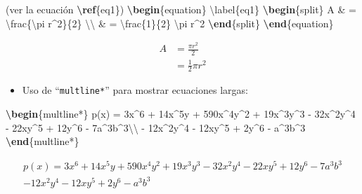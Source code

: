 \documentclass[12pt,a4paper,oneside,]{article}
\newenvironment{Shaded}{\begin{snugshade}}{\end{snugshade}}
\newcommand{\ExtensionTok}[1]{#1}
\newcommand{\KeywordTok}[1]{\textcolor[rgb]{0.13,0.29,0.53}{\textbf{#1}}}
\newcommand{\NormalTok}[1]{#1}
\newcommand{\SpecialCharTok}[1]{\textcolor[rgb]{0.00,0.00,0.00}{#1}}
\newcommand{\SpecialStringTok}[1]{\textcolor[rgb]{0.31,0.60,0.02}{#1}}
\providecommand{\tightlist}{%
  \setlength{\itemsep}{0pt}\setlength{\parskip}{0pt}}
\numberwithin{dummy}{section}
\theoremstyle{ocrenumbox}
\theoremstyle{blacknumex}
\theoremstyle{blacknumbox}
\theoremstyle{ocrenum}
\theoremstyle{ocrenum}
\begin{document}
\begin{Shaded}
\begin{Highlighting}[]
\NormalTok{(ver la ecuación }\KeywordTok{\textbackslash{}ref}\NormalTok{\{}\ExtensionTok{eq1}\NormalTok{\})}
\KeywordTok{\textbackslash{}begin}\NormalTok{\{}\ExtensionTok{equation}\NormalTok{\}}\SpecialStringTok{ }\SpecialCharTok{\textbackslash{}label}\SpecialStringTok{\{eq1\}}
\KeywordTok{\textbackslash{}begin}\NormalTok{\{}\ExtensionTok{split}\NormalTok{\}}
\SpecialStringTok{A \& = }\SpecialCharTok{\textbackslash{}frac}\SpecialStringTok{\{}\SpecialCharTok{\textbackslash{}pi}\SpecialStringTok{ r\^{}2\}\{2\} }\SpecialCharTok{\textbackslash{}\textbackslash{}}
\SpecialStringTok{ \& = }\SpecialCharTok{\textbackslash{}frac}\SpecialStringTok{\{1\}\{2\} }\SpecialCharTok{\textbackslash{}pi}\SpecialStringTok{ r\^{}2}
\KeywordTok{\textbackslash{}end}\NormalTok{\{}\ExtensionTok{split}\NormalTok{\}}
\KeywordTok{\textbackslash{}end}\NormalTok{\{}\ExtensionTok{equation}\NormalTok{\}}
\end{Highlighting}
\end{Shaded}

\begin{equation} \label{eq1}
\begin{split}
A & = \frac{\pi r^2}{2} \\
 & = \frac{1}{2} \pi r^2
\end{split}
\end{equation}

\begin{itemize}
\tightlist
\item
  Uso de ``\texttt{multline*}'' para mostrar ecuaciones largas:
\end{itemize}

\begin{Shaded}
\begin{Highlighting}[]
\KeywordTok{\textbackslash{}begin}\NormalTok{\{}\ExtensionTok{multline*}\NormalTok{\}}
\SpecialStringTok{p(x) = 3x\^{}6 + 14x\^{}5y + 590x\^{}4y\^{}2 + 19x\^{}3y\^{}3 }
\SpecialStringTok{            {-} 32x\^{}2y\^{}4 {-} 22xy\^{}5 + 12y\^{}6 {-} 7a\^{}3b\^{}3}\SpecialCharTok{\textbackslash{}\textbackslash{}}\SpecialStringTok{ }
\SpecialStringTok{{-} 12x\^{}2y\^{}4 {-} 12xy\^{}5 + 2y\^{}6 {-} a\^{}3b\^{}3}
\KeywordTok{\textbackslash{}end}\NormalTok{\{}\ExtensionTok{multline*}\NormalTok{\}}
\end{Highlighting}
\end{Shaded}

\begin{multline*}
p(x) = 3x^6 + 14x^5y + 590x^4y^2 + 19x^3y^3 
            - 32x^2y^4 - 22xy^5 + 12y^6 - 7a^3b^3 \\ 
- 12x^2y^4 - 12xy^5 + 2y^6 - a^3b^3
\end{multline*}
\end{document}
